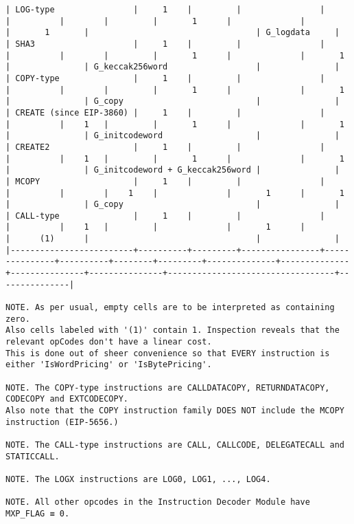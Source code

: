 \documentclass[varwidth=\maxdimen,margin=0.5cm,multi={verbatim}]{standalone}
\begin{document}
\begin{verbatim}
| LOG-type                |     1    |         |                |               |          |        |         |       1      |              |               |       1       |                                  | G_logdata     |
| SHA3                    |     1    |         |                |               |          |        |         |       1      |              |       1       |               | G_keccak256word                  |               |
| COPY-type               |     1    |         |                |               |          |        |         |       1      |              |       1       |               | G_copy                           |               |
| CREATE (since EIP-3860) |     1    |         |                |               |          |    1   |         |       1      |              |       1       |               | G_initcodeword                   |               |
| CREATE2                 |     1    |         |                |               |          |    1   |         |       1      |              |       1       |               | G_initcodeword + G_keccak256word |               |
| MCOPY                   |     1    |         |                |               |          |        |    1    |              |       1      |       1       |               | G_copy                           |               |
| CALL-type               |     1    |         |                |               |          |    1   |         |              |       1      |               |      (1)      |                                  |               |
|-------------------------+----------+---------+----------------+---------------+----------+--------+---------+--------------+--------------+---------------+---------------+----------------------------------+---------------|

NOTE. As per usual, empty cells are to be interpreted as containing zero.
Also cells labeled with '(1)' contain 1. Inspection reveals that the relevant opCodes don't have a linear cost.
This is done out of sheer convenience so that EVERY instruction is either 'IsWordPricing' or 'IsBytePricing'.

NOTE. The COPY-type instructions are CALLDATACOPY, RETURNDATACOPY, CODECOPY and EXTCODECOPY.
Also note that the COPY instruction family DOES NOT include the MCOPY instruction (EIP-5656.)

NOTE. The CALL-type instructions are CALL, CALLCODE, DELEGATECALL and STATICCALL.

NOTE. The LOGX instructions are LOG0, LOG1, ..., LOG4.

NOTE. All other opcodes in the Instruction Decoder Module have MXP_FLAG ≡ 0.

\end{verbatim}
\end{document}
